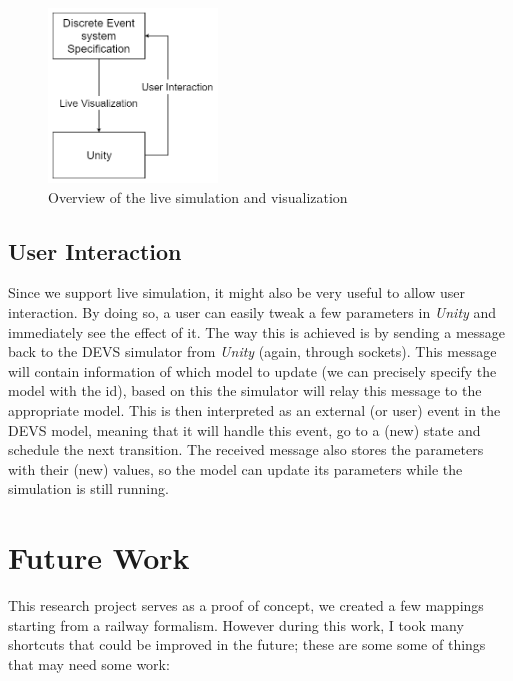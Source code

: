\documentclass{article}
\begin{document}
\begin{figure}[H]
    \centering
    \includegraphics[width=0.4\textwidth]{images/live_simulation_overview.png}
    \caption{Overview of the live simulation and visualization}
    \label{live_simulation_overview}
\end{figure}

\subsection{User Interaction}

Since we support live simulation, it might also be very useful to allow user interaction. By doing so, a user can easily tweak a few parameters in \textit{Unity} and immediately see the effect of it. The way this is achieved is by sending a message back to the DEVS simulator from \textit{Unity} (again, through sockets). This message will contain information of which model to update (we can precisely specify the model with the id), based on this the simulator will relay this message to the appropriate model. This is then interpreted as an external (or user) event in the DEVS model, meaning that it will handle this event, go to a (new) state and schedule the next transition. The received message also stores the parameters with their (new) values, so the model can update its parameters while the simulation is still running.


\section{Future Work}

This research project serves as a proof of concept, we created a few mappings starting from a railway formalism. However during this work, I took many shortcuts that could be improved in the future; these are some some of things that may need some work:
\end{document}
